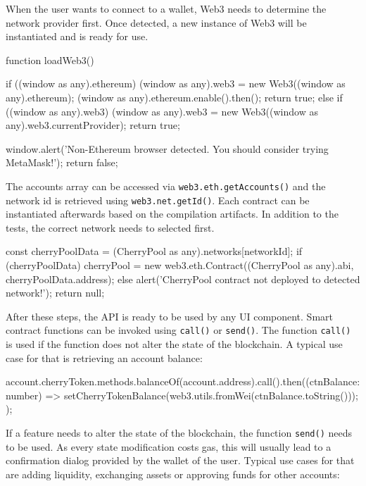 When the user wants to connect to a wallet, Web3 needs to determine the network provider first. Once detected, a new instance of Web3 will be instantiated and is ready for use.

\begin{JsCode}
function loadWeb3() {
  if ((window as any).ethereum) {
    (window as any).web3 = new Web3((window as any).ethereum);
    (window as any).ethereum.enable().then();
    return true;
  } else if ((window as any).web3) {
    (window as any).web3 = new Web3((window as any).web3.currentProvider);
    return true;
  }

  window.alert('Non-Ethereum browser detected. You should consider trying MetaMask!');
  return false;
}	
\end{JsCode}

The accounts array can be accessed via \texttt{web3.eth.getAccounts()} and the network id is retrieved using \texttt{web3.net.getId()}. Each contract can be instantiated afterwards based on the compilation artifacts. In addition to the tests, the correct network needs to selected first.

\begin{JsCode}
const cherryPoolData = (CherryPool as any).networks[networkId];
if (cherryPoolData) {
  cherryPool = new web3.eth.Contract((CherryPool as any).abi, cherryPoolData.address);
} else {
  alert('CherryPool contract not deployed to detected network!');
  return null;
}	
\end{JsCode}

After these steps, the API is ready to be used by any UI component. Smart contract functions can be invoked using \texttt{call()} or \texttt{send()}. The function \texttt{call()} is used if the function does not alter the state of the blockchain. A typical use case for that is retrieving an account balance:

\begin{JsCode}
account.cherryToken.methods.balanceOf(account.address).call().then((ctnBalance: number) => {
  setCherryTokenBalance(web3.utils.fromWei(ctnBalance.toString()));
});
          
\end{JsCode}

If a feature needs to alter the state of the blockchain, the function \texttt{send()} needs to be used. As every state modification costs gas, this will usually lead to a confirmation dialog provided by the wallet of the user. Typical use cases for that are adding liquidity, exchanging assets or approving funds for other accounts:

